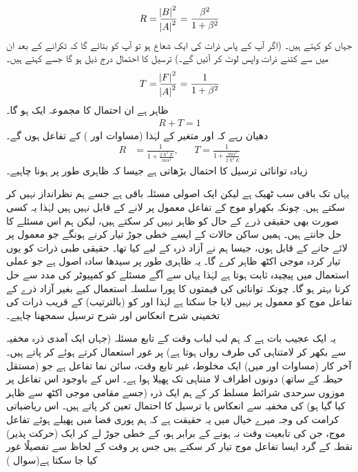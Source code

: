 \begin{align}
R=\frac{\abs B^{2}}{\abs A^{2}}=\frac{\beta^{2}}{1+\beta^{2}}
\end{align}
جہاں  کو کہتے ہیں۔ (اگر آپ کے پاس ذرات کی ایک شعاع ہو تو    آپ کو بتائے گا کہ   ٹکرانے کے بعد ان میں سے کتنے ذرات  واپس لوٹ کر آئیں گے۔)  ترسیل کا  احتمال درج ذیل ہو گا جسے کہتے ہیں۔
\begin{align}
T=\frac{\abs F^{2}}{\abs A^{2}}=\frac{1}{1+\beta^{2}}
\end{align}
 ظاہر ہے ان احتمال کا مجموعہ ایک  ہو گا۔
  \begin{align}
  R+T=1
  \end{align}
 دھیان رہے کہ  اور   متغیر  کے لہٰذا  (مساوات  اور )     کے تفاعل ہوں گے۔
  \begin{align}\label{مساوات_شروڈنگر_انعکاس_ترسیل_مستقل}
  R&=\frac{1}{1+\tfrac{2\hslash^{2}E}{m\alpha^{2}}},&& T =\frac{1}{1+\tfrac{m\alpha^{2}}{2\hslash^{2}E}}
  \end{align}  
  زیادہ  توانائی ترسیل کا احتمال بڑھاتی ہے جیسا کہ ظاہری طور پر ہونا چاہیے۔  
  
  یہاں تک باقی سب ٹھیک ہے لیکن ایک اصولی مسئلہ باقی  ہے جسے ہم نظرانداز نہیں کر سکتے ہیں.  چونکہ بکھراو   موج کے  تفاعل معمول پر لانے کے قابل نہیں ہیں لہٰذا یہ کسی صورت بھی حقیقی  ذرے کے حال کو ظاہر نہیں کر سکتے ہیں، لیکن ہم اس مسئلے کا حل جانتے ہیں۔ ہمیں ساکن حالات کے ایسے خطی جوڑ تیار کرنے ہونگے جو معمول پر لائے جانے کے قابل ہوں، جیسا ہم نے آزاد ذرہ  کے لیے کیا تھا۔   حقیقی طبی ذرات کو یوں تیار کردہ موجی اکٹھ  ظاہر کرے گا۔   یہ ظاہری طور پر سیدھا سادہ اصول ہے جو  عملی استعمال میں پیچیدہ ثابت ہوتا ہے لہٰذا یہاں سے آگے مسئلے کو کمپیوٹر کی مدد سے حل کرنا بہتر ہو گا۔  چونکہ  توانائی کی قیمتوں کا پورا سلسلہ استعمال کیے بغیر آزاد   ذرے کے تفاعل موج کو معمول پر نہیں لایا جا سکتا ہے لہٰذا    اور     کو (بالترتیب)    کے قریب ذرات کی تخمینی شرح  انعکاس   اور شرح ترسیل سمجھنا چاہیے۔ 
  
   یہ ایک عجیب بات ہے کہ ہم لب لباب وقت کے تابع مسئلہ (جہاں ایک آمدی ذرہ مخفیہ سے  بکھر کر لامتناہی کی طرف رواں ہوتا ہے)  پر غور     استعمال کرتے ہوئے کر پاتے  ہیں۔  آخر کار  (مساوات   اور  میں) ایک مخلوط، غیر تابع وقت، سائن   نما تفاعل ہے جو (مستقل  حیطہ  کے ساتھ)  دونوں اطراف لا متناہی تک  پھیلا ہوا ہے۔ اس کے باوجود اس تفاعل پر موزوں سرحدی شرائط مسلط کر کے ہم  ایک ذرہ    (جسے مقامی موجی اکٹھ  سے ظاہر کیا گیا ہو)  کی مخفیہ سے انعکاس یا ترسیل کا احتمال تعین کر پاتے ہیں۔ اس ریاضیاتی کرامت کی وجہ میرے خیال میں یہ حقیقت ہے  کہ  ہم پوری  فضا میں پھیلے ہوئے تفاعل موج، جن کی تابعیت  وقت   نہ ہونے کے برابر ہو، کے خطی جوڑ لے کر ایک (حرکت پذیر)  نقطہ کے گرد ایسا تفاعل موج تیار کر سکتے ہیں جس پر  وقت کے لحاظ سے تفصیلًا غور کیا جا سکتا ہے(سوال  )
  
